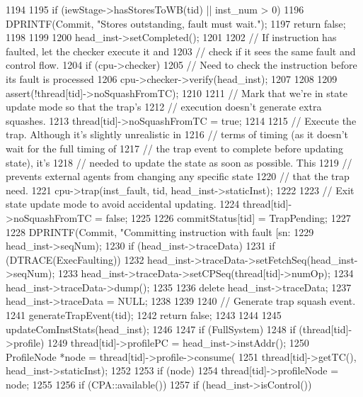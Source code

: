 \begin{DoxyCode}
{{1194 
1195         if (iewStage->hasStoresToWB(tid) || inst_num > 0) {
1196             DPRINTF(Commit, "Stores outstanding, fault must wait.\n");
1197             return false;
1198         }
1199 
1200         head_inst->setCompleted();
1201 
1202         // If instruction has faulted, let the checker execute it and
1203         // check if it sees the same fault and control flow.
1204         if (cpu->checker) {
1205             // Need to check the instruction before its fault is processed
1206             cpu->checker->verify(head_inst);
1207         }
1208 
1209         assert(!thread[tid]->noSquashFromTC);
1210 
1211         // Mark that we're in state update mode so that the trap's
1212         // execution doesn't generate extra squashes.
1213         thread[tid]->noSquashFromTC = true;
1214 
1215         // Execute the trap.  Although it's slightly unrealistic in
1216         // terms of timing (as it doesn't wait for the full timing of
1217         // the trap event to complete before updating state), it's
1218         // needed to update the state as soon as possible.  This
1219         // prevents external agents from changing any specific state
1220         // that the trap need.
1221         cpu->trap(inst_fault, tid, head_inst->staticInst);
1222 
1223         // Exit state update mode to avoid accidental updating.
1224         thread[tid]->noSquashFromTC = false;
1225 
1226         commitStatus[tid] = TrapPending;
1227 
1228         DPRINTF(Commit, "Committing instruction with fault [sn:%
1229             head_inst->seqNum);
1230         if (head_inst->traceData) {
1231             if (DTRACE(ExecFaulting)) {
1232                 head_inst->traceData->setFetchSeq(head_inst->seqNum);
1233                 head_inst->traceData->setCPSeq(thread[tid]->numOp);
1234                 head_inst->traceData->dump();
1235             }
1236             delete head_inst->traceData;
1237             head_inst->traceData = NULL;
1238         }
1239 
1240         // Generate trap squash event.
1241         generateTrapEvent(tid);
1242         return false;
1243     }
1244 
1245     updateComInstStats(head_inst);
1246 
1247     if (FullSystem) {
1248         if (thread[tid]->profile) {
1249             thread[tid]->profilePC = head_inst->instAddr();
1250             ProfileNode *node = thread[tid]->profile->consume(
1251                     thread[tid]->getTC(), head_inst->staticInst);
1252 
1253             if (node)
1254                 thread[tid]->profileNode = node;
1255         }
1256         if (CPA::available()) {
1257             if (head_inst->isControl()) {
}}}}
\end{DoxyCode}
